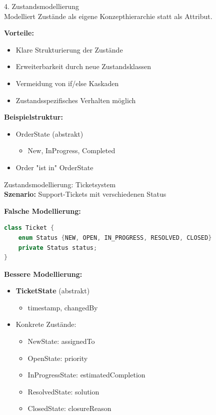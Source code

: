 \begin{concept}{4. Zustandsmodellierung}\\
Modelliert Zustände als eigene Konzepthierarchie statt als Attribut.

\textbf{Vorteile:}
\begin{itemize}
    \item Klare Strukturierung der Zustände
    \item Erweiterbarkeit durch neue Zustandsklassen
    \item Vermeidung von if/else Kaskaden
    \item Zustandsspezifisches Verhalten möglich
\end{itemize}

\textbf{Beispielstruktur:}
\begin{itemize}
    \item OrderState (abstrakt)
    \begin{itemize}
        \item New, InProgress, Completed
    \end{itemize}
    \item Order "ist in" OrderState
\end{itemize}
\end{concept}

\begin{example2}{Zustandsmodellierung: Ticketsystem}\\
\textbf{Szenario:} Support-Tickets mit verschiedenen Status

\textbf{Falsche Modellierung:}
\begin{lstlisting}[language=Java, style=base]
class Ticket {
    enum Status {NEW, OPEN, IN_PROGRESS, RESOLVED, CLOSED}
    private Status status;
}
\end{lstlisting}

\textbf{Bessere Modellierung:}
\begin{itemize}
    \item \textbf{TicketState} (abstrakt)
    \begin{itemize}
        \item timestamp, changedBy
    \end{itemize}
    \item Konkrete Zustände:
    \begin{itemize}
        \item NewState: assignedTo
        \item OpenState: priority
        \item InProgressState: estimatedCompletion
        \item ResolvedState: solution
        \item ClosedState: closureReason
    \end{itemize}
\end{itemize}
\end{example2}

